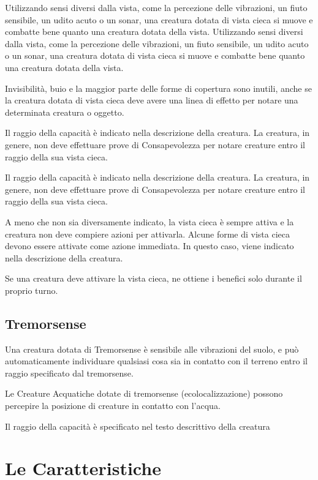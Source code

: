 \documentclass[a4paper,11pt,twoside,openany]{book}
\begin{document}
Utilizzando sensi diversi dalla vista, come la percezione delle vibrazioni, un fiuto sensibile, un udito acuto o un sonar, una creatura dotata di vista cieca si muove e combatte bene quanto una creatura dotata della vista.
Utilizzando sensi diversi dalla vista, come la percezione delle vibrazioni, un fiuto sensibile, un udito acuto o un sonar, una creatura dotata di vista cieca si muove e combatte bene quanto una creatura dotata della vista.

Invisibilità, buio e la maggior parte delle forme di copertura sono inutili, anche se la creatura dotata di vista cieca deve avere una linea di effetto per notare una determinata creatura o oggetto.

Il raggio della capacità è indicato nella descrizione della creatura. La creatura, in genere, non deve effettuare prove di Consapevolezza per notare creature entro il raggio della sua vista cieca.

Il raggio della capacità è indicato nella descrizione della creatura. La creatura, in genere, non deve effettuare prove di Consapevolezza per notare creature entro il raggio della sua vista cieca.

A meno che non sia diversamente indicato, la vista cieca è sempre attiva e la creatura non deve compiere azioni per attivarla. Alcune forme di vista cieca devono essere attivate come azione immediata. In questo caso, viene indicato nella descrizione della creatura.

Se una creatura deve attivare la vista cieca, ne ottiene i benefici solo durante il proprio turno.

\subsection{Tremorsense}
Una creatura dotata di Tremorsense è sensibile alle vibrazioni del suolo, e può automaticamente individuare qualsiasi cosa sia in contatto con il terreno entro il raggio specificato dal tremorsense.

Le Creature Acquatiche dotate di tremorsense (ecolocalizzazione) possono percepire la posizione di creature in contatto con l’acqua.

Il raggio della capacità è specificato nel testo descrittivo della creatura

\pagebreak

\section{Le Caratteristiche}
\end{document}
